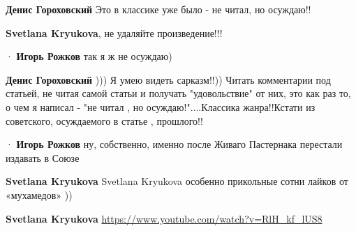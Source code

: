 \begin{itemize}
\begin{itemize}
\textbf{Денис Гороховский} Это в классике уже было - не читал, но осуждаю!!

 
\textbf{Svetlana Kryukova}, не удаляйте произведение!!!

 
  · 
\textbf{Игорь Рожков} так я ж не осуждаю)

 
\textbf{Денис Гороховский} ))) Я умею видеть сарказм!!)) Читать комментарии под статьей, не читая самой статьи и получать "удовольствие" от них, это как раз то, о чем я написал - "не читал , но осуждаю!"....Классика жанра!!Кстати из советского, осуждаемого в статье , прошлого!!

 
  · 
\textbf{Игорь Рожков} ну, собственно, именно после Живаго Пастернака перестали издавать в Союзе

 
\textbf{Svetlana Kryukova} Svetlana Kryukova особенно прикольные сотни лайков от «мухамедов» ))

 
\textbf{Svetlana Kryukova} \url{https://www.youtube.com/watch?v=RlH_kf_lUS8}


\end{itemize}
\end{itemize}
